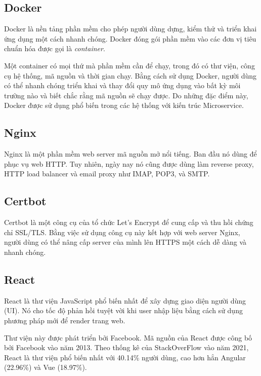 \documentclass[./../main.tex]{subfiles}
\begin{document}
\hypertarget{docker}{%
\subsection{Docker}\label{docker}}

Docker \cite{Docker22} là nền tảng phần mềm cho phép người dùng dựng, kiểm thử và triển
khai ứng dụng một cách nhanh chóng. Docker đóng gói phần mềm vào các đơn
vị tiêu chuẩn hóa được gọi là \emph{container}.

Một container có mọi thứ mà phần mềm cần để chạy, trong đó có thư viện,
công cụ hệ thống, mã nguồn và thời gian chạy. Bằng cách sử dụng Docker,
người dùng có thể nhanh chóng triển khai và thay đổi quy mô ứng dụng vào
bất kỳ môi trường nào và biết chắc rằng mã nguồn sẽ chạy được. Do những
đặc điểm này, Docker được sử dụng phổ biến trong các hệ thống với kiến
trúc Microservice.

\hypertarget{nginx}{%
\subsection{Nginx}\label{nginx}}

Nginx \cite{Nginx22} là một phần mềm web server mã nguồn mở nổi tiếng. Ban đầu nó dùng
để phục vụ web HTTP. Tuy nhiên, ngày nay nó cũng được dùng làm reverse
proxy, HTTP load balancer và email proxy như IMAP, POP3, và SMTP.

\hypertarget{certbot}{%
\subsection{Certbot}\label{certbot}}

Certbot là một công cụ của tổ chức Let's Encrypt để cung cấp và thu hồi
chứng chỉ SSL/TLS. Bằng việc sử dụng công cụ này kết hợp với web server
Nginx, người dùng có thể nâng cấp server của mình lên HTTPS một cách dễ
dàng và nhanh chóng.

\hypertarget{react}{%
\subsection{React}\label{react}}

React là thư viện JavaScript phổ biến nhất để xây dựng giao diện người
dùng (UI). Nó cho tốc độ phản hồi tuyệt vời khi user nhập liệu bằng cách
sử dụng phương pháp mới để render trang web.

Thư viện này được phát triển bởi Facebook. Mã nguồn của React được công
bố bởi Facebook vào năm 2013. Theo thống kê của StackOverFlow vào năm
2021, React là thư viện phổ biến nhất với 40.14\% người dùng, cao hơn
hẳn Angular (22.96\%) và Vue (18.97\%).
\end{document}
